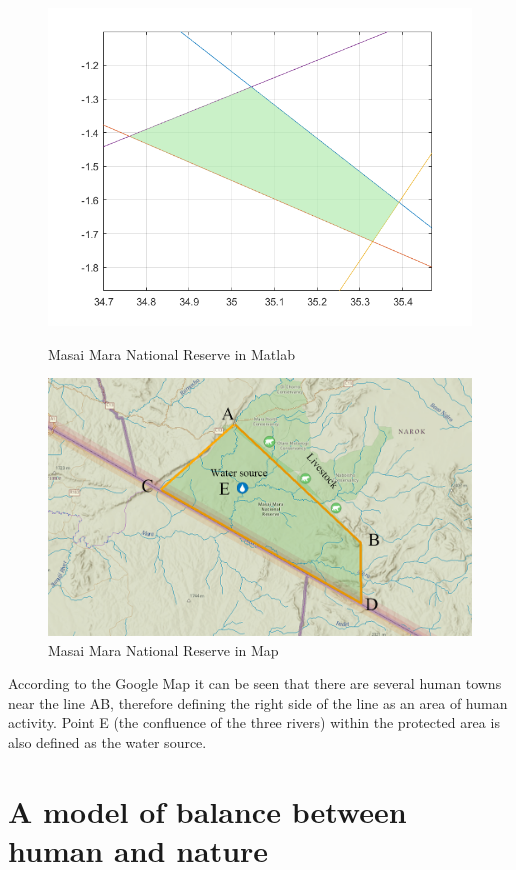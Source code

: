 \documentclass{mcmthesis}
\numberwithin{figure}{section}
\numberwithin{table}{section}
\numberwithin{equation}{section}
\begin{document}
 \begin{figure}[htp]
 	\centering
 	\begin{minipage}[t]{0.48\linewidth}
 		\centering
 		\includegraphics[width=0.7\linewidth]{"figures/F 4.2"}
 		\caption{Masai Mara National Reserve in Matlab }
 		\label{F 4.2}
 	\end{minipage}\hfill
 	\begin{minipage}[t]{0.48\linewidth}
 		\centering
 		\includegraphics[width=0.7\linewidth]{"figures/F4.3 Masai area Map"}
 		\caption{Masai Mara National Reserve in Map}
 		\label{F 4.3}
 	\end{minipage}\hfill
 \end{figure}
 
 According to the Google Map it can be seen that there are several human towns near the line AB, therefore defining the right side of the line as an area of human activity. Point E (the confluence of the three rivers) within the protected area is also defined as the water source.
 
\section{A model of balance between human and nature}
\end{document}
